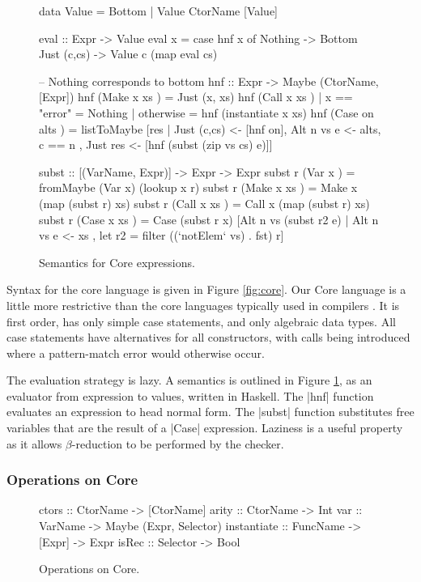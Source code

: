 \begin{figure}
\begin{code}
data Value = Bottom | Value CtorName [Value]

eval :: Expr -> Value
eval x = case  hnf x of
               Nothing      -> Bottom
               Just (c,cs)  -> Value c (map eval cs)

-- Nothing corresponds to bottom
hnf :: Expr -> Maybe (CtorName, [Expr])
hnf (Make  x   xs    )  =  Just (x, xs)
hnf (Call  x   xs    )  |  x == "error"  = Nothing
                        |  otherwise     = hnf (instantiate x xs)
hnf (Case  on  alts  )  =  listToMaybe [res
       |  Just (c,cs) <- [hnf on], Alt n vs e <- alts, c == n
       ,  Just res <- [hnf (subst (zip vs cs) e)]]

subst :: [(VarName, Expr)] -> Expr -> Expr
subst r (Var   x     ) = fromMaybe (Var x) (lookup x r)
subst r (Make  x xs  ) = Make  x (map (subst r) xs)
subst r (Call  x xs  ) = Call  x (map (subst r) xs)
subst r (Case  x xs  ) = Case (subst r x)
    [Alt n vs (subst r2 e) | Alt n vs e <- xs
    , let r2 = filter ((`notElem` vs) . fst) r]
\end{code}
\caption{Semantics for Core expressions.}
\label{fig:semantics}
\figureend
\end{figure}

Syntax for the core language is given in Figure \ref{fig:core}. Our Core language is a little more restrictive than the core languages typically used in compilers \citep{ghc_core}. It is first order, has only simple case statements, and only algebraic data types. All case statements have alternatives for all constructors, with  calls being introduced where a pattern-match error would otherwise occur.

The evaluation strategy is lazy. A semantics is outlined in Figure \ref{fig:semantics}, as an evaluator from expression to values, written in Haskell. The |hnf| function evaluates an expression to head normal form. The |subst| function substitutes free variables that are the result of a |Case| expression. Laziness is a useful property as it allows $\beta$-reduction to be performed by the checker.

\subsubsection{Operations on Core}

\begin{figure}
\begin{code}
ctors        :: CtorName  -> [CtorName]
arity        :: CtorName  -> Int
var          :: VarName   -> Maybe (Expr, Selector)
instantiate  :: FuncName  -> [Expr] -> Expr
isRec        :: Selector  -> Bool
\end{code}
\caption{Operations on Core.}
\label{fig:core_operations}
\figureend
\end{figure}

